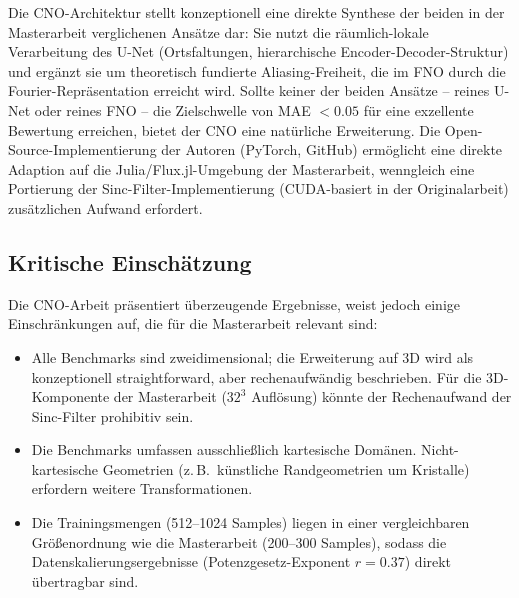 \documentclass[a4paper,12pt]{article}
\begin{document}
Die CNO-Architektur stellt konzeptionell eine direkte Synthese der beiden
in der Masterarbeit verglichenen Ans\"atze dar: Sie nutzt die r\"aumlich-lokale
Verarbeitung des U-Net (Ortsfaltungen, hierarchische Encoder-Decoder-Struktur)
und erg\"anzt sie um theoretisch fundierte Aliasing-Freiheit, die im FNO
durch die Fourier-Repr\"asentation erreicht wird. Sollte keiner der beiden
Ans\"atze -- reines U-Net oder reines FNO -- die Zielschwelle von
MAE $< 0.05$ f\"ur eine exzellente Bewertung erreichen, bietet der CNO
eine nat\"urliche Erweiterung. Die Open-Source-Implementierung der Autoren
(PyTorch, GitHub) erm\"oglicht eine direkte Adaption auf die
Julia/Flux.jl-Umgebung der Masterarbeit, wenngleich eine Portierung der
Sinc-Filter-Implementierung (CUDA-basiert in der Originalarbeit) zus\"atzlichen
Aufwand erfordert.

\subsection*{Kritische Einsch\"atzung}

Die CNO-Arbeit pr\"asentiert \"uberzeugende Ergebnisse, weist jedoch einige
Einschr\"ankungen auf, die f\"ur die Masterarbeit relevant sind:

\begin{itemize}
  \item Alle Benchmarks sind zweidimensional; die Erweiterung auf 3D wird als
    konzeptionell straightforward, aber rechenaufw\"andig beschrieben. F\"ur
    die 3D-Komponente der Masterarbeit ($32^3$ Aufl\"osung) k\"onnte der
    Rechenaufwand der Sinc-Filter prohibitiv sein.
  \item Die Benchmarks umfassen ausschlie\ss lich kartesische Dom\"anen. Nicht-kartesische
    Geometrien (z.\,B.\ k\"unstliche Randgeometrien um Kristalle) erfordern
    weitere Transformationen.
  \item Die Trainingsmengen (512--1024 Samples) liegen in einer vergleichbaren
    Gr\"o\ss enordnung wie die Masterarbeit (200--300 Samples), sodass die
    Datenskalierungsergebnisse (Potenzgesetz-Exponent $r = 0.37$) direkt
    \"ubertragbar sind.
\end{itemize}
\end{document}
